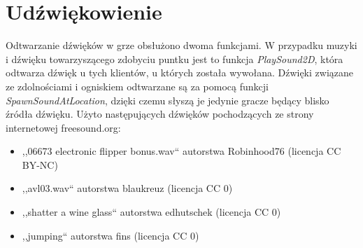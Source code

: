 \documentclass[multip]{SGGW-thesis}
\begin{document}
\section{Udźwiękowienie}
Odtwarzanie dźwięków w grze obsłużono dwoma funkcjami. W przypadku muzyki i dźwięku towarzyszącego zdobyciu puntku jest to funkcja {\em PlaySound2D}, która odtwarza dźwięk u tych klientów, u których została wywołana. Dźwięki związane ze zdolnościami i ogniskiem odtwarzane są za pomocą funkcji {\em SpawnSoundAtLocation}, dzięki czemu słyszą je jedynie gracze będący blisko źródła dźwięku.
\newline \indent Użyto następujących dźwięków pochodzących ze strony internetowej freesound.org:
\begin{itemize}
\item ,,06673 electronic flipper bonus.wav`` autorstwa Robinhood76 (licencja CC BY-NC)
\item ,,avl03.wav`` autorstwa blaukreuz (licencja CC 0)
\item ,,shatter a wine glass`` autorstwa edhutschek (licencja CC 0)
\item ,,jumping`` autorstwa fins (licencja CC 0)
\end{itemize}
\end{document}
